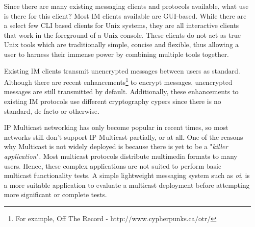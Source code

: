 
Since there are many existing messaging clients and protocols available,
what use is there for this client? Most IM clients available are 
GUI-based. While there are a select few CLI based clients for Unix 
systems, they are all interactive clients that work in the 
foreground of a Unix console. These clients do not act as true Unix 
tools which are traditionally simple, concise and flexible, thus 
allowing a user to harness their immense power by combining multiple 
tools together.


Existing IM clients transmit unencrypted messages between users as
standard. Although there are 
recent enhancements\footnote{For example, Off The Record - http://www.cypherpunks.ca/otr/}
to encrypt messages, unencrypted messages are still transmitted by 
default. Additionally, these enhancements to existing IM protocols use 
different cryptography cypers since there is no standard, de facto or 
otherwise.


IP Multicast networking has only become popular in recent times, so most
networks still don't support IP Multicast partially, or at all. One of
the reasons why Multicast is not widely deployed is because there is yet
to be a "\emph{killer application}". Most multicast protocols 
distribute multimedia formats to many users. Hence, these complex 
applications are not suited to perform basic multicast functionality 
tests. A simple lightweight messaging system such as \emph{oi}, is a 
more suitable application to evaluate a multicast deployment before 
attempting more significant or complete tests.

